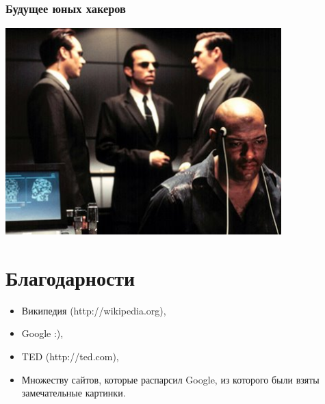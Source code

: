 \documentclass[compress,red]{beamer}
\begin{document}
\subsection{}
\begin{frame}
  \frametitle{Будущее юных хакеров}
  \centerline{\includegraphics[width=0.8\textwidth]{images/HackerDestiny.jpg}}
\end{frame}


\section{Благодарности}
\begin{frame}
  \begin{itemize}
    \item Википедия (http://wikipedia.org),
    \item Google :),
    \item TED (http://ted.com),
    \item Множеству сайтов, которые распарсил Google, из которого были взяты замечательные картинки.
  \end{itemize}
\end{frame}
\end{document}
